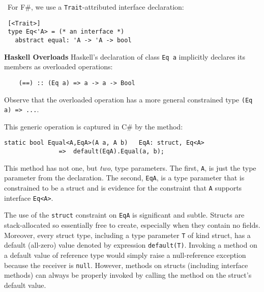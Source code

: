 \documentclass[9pt]{sig-alternate-05-2015}
\newif\ifclassic
\begin{document}
\ifclassic
For new F\# syntax we adopt the keyword \lstinline{concept} (\lstinline{class} is already taken):

\lstset{language={FSharp}}
\begin{lstlisting}
concept Eq 'a where 
    (==): 'a -> 'a -> bool
\end{lstlisting}
\else
\noindent\ For F\#, we use a  \lstinline{Trait}-attributed interface declaration:
\begin{lstlisting}
 [<Trait>] 
 type Eq<'A> = (* an interface *)
   abstract equal: 'A -> 'A -> bool
\end{lstlisting}
\fi
 
{\bf  Haskell Overloads} Haskell's declaration of class \lstinline{Eq a} implicitly declares its members as overloaded 
operations:

\begin{lstlisting}
    (==) :: (Eq a) => a -> a -> Bool 
\end{lstlisting}
Observe that the overloaded operation has a more general constrained type \lstinline{(Eq a) => ...}.

This generic operation is captured in C\# by the method:
\begin{lstlisting}
static bool Equal<A,EqA>(A a, A b)   EqA: struct, Eq<A>
               =>  default(EqA).Equal(a, b);
\end{lstlisting}
This method has not one, but \emph{two}, type parameters. The first, \lstinline{A}, is just the type parameter from the declaration.
The second, \lstinline{EqA}, is a type parameter that is constrained to be a struct and is evidence for the constraint that \lstinline{A} supports interface \lstinline{Eq<A>}.

The use of the \lstinline{struct} constraint on \lstinline{EqA} is significant and subtle. Structs are stack-allocated so essentially free to create, especially when they contain no fields.
Moreover, every struct type, including a type parameter \lstinline{T} of kind struct, has a default (all-zero) value denoted by
 expression \lstinline{default(T)}.
Invoking a method on a default value of reference type would simply raise a null-reference exception because the receiver is \lstinline{null}.
However, methods on structs (including interface methods) can always be properly invoked
by calling the method on the struct's default value. 
\end{document}
